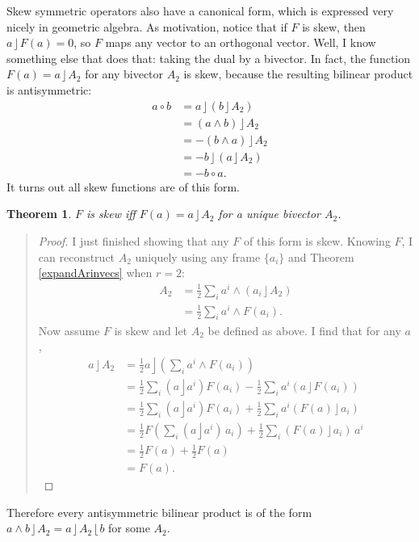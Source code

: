 \documentclass{utarticle}
\DeclareMathOperator{\lin}{\rfloor}
\DeclareMathOperator{\rin}{\lfloor}
\DeclareMathOperator{\out}{\wedge}
\newcommand{\half}{\ensuremath{\frac{1}{2}}}
\newtheorem{thm}{Theorem}
\newcommand{\bp}{\begin{quotation} \begin{proof}}
\newcommand{\ep}{\end{proof} \end{quotation}}
\begin{document}
Skew symmetric operators also have a canonical form, which is expressed very nicely in geometric algebra.
As motivation, notice that if $F$ is skew, then $a \lin F(a) = 0$, so $F$ maps any vector to an orthogonal vector.  
Well, I know something else that does that: taking the dual by a bivector.  In fact, the function $F(a) = a \lin A_2$ 
for any bivector $A_2$ is skew, because the resulting bilinear product is antisymmetric:
\begin{align}
a \circ b & = a \lin (b \lin A_2) \nonumber \\
               & = (a \out b) \lin A_2 \nonumber \\
               & = -(b \out a) \lin A_2 \nonumber \\
               & = -b \lin (a \lin A_2) \nonumber \\
               & = -b \circ a.
\end{align}
It turns out all skew functions are of this form.
\begin{thm}
$F$ is skew iff $F(a) = a \lin A_2$ for a unique bivector $A_2$.
\end{thm}
\bp
I just finished showing that any $F$ of this form is skew.  Knowing $F$, I can reconstruct $A_2$ uniquely using 
any frame $\{a_i\}$ and Theorem \ref{expandArinvecs} 
when $r=2$:
\begin{align}
A_2 & = \half \sum_i a^i \out (a_i \lin A_2) \nonumber \\
        & = \half \sum_i a^i \out F(a_i).
\end{align}
Now assume $F$ is skew and let $A_2$ be defined as above.  I find that for any $a$,
\begin{align}
a \lin A_2 & = \half a \lin \left(\sum_i a^i \out F(a_i)\right) \nonumber \\
                 & = \half \sum_i (a \lin a^i) F(a_i) - \half \sum_i a^i (a \lin F(a_i)) \nonumber \\
                 & = \half \sum_i (a \lin a^i) F(a_i) + \half \sum_i a^i (F(a) \lin a_i) \nonumber \\
                 & = \half F\left( \sum_i (a \lin a^i) \, a_i \right) + \half \sum_i (F(a) \lin a_i) \, a^i \nonumber \\
                 & = \half F(a) + \half F(a) \nonumber \\
                 & = F(a).
\end{align}
\ep
Therefore every antisymmetric bilinear product is of the form $a \out b \lin A_2 = a \lin A_2 \rin b$ for some $A_2$.
\end{document}
